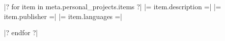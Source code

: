 



\begin{cvhonors}

|? for item in meta.personal_projects.items ?|
  \cvhonor
    {} %
    {|= item.description =|} %
    {|= item.publisher =|} %
    {|= item.languages =|} %

|? endfor ?|
\end{cvhonors}
